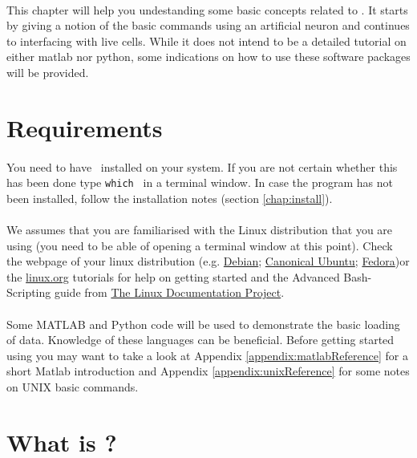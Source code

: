\paragraph{}
This chapter will help you undestanding some basic concepts related to \progname. It starts by giving a notion of the basic commands using an artificial neuron and continues to interfacing with live cells. While it does not intend to be a detailed tutorial on either matlab nor python, some indications on how to use these software packages will be provided.

\section{Requirements}
\paragraph{}
You need to have \progname\ installed on your system. If you are not certain whether this has been done type \texttt{which \progname} in a terminal window. In case the program has not been installed, follow the installation notes (section \ref{chap:install}).

\paragraph{}
We assumes that you are familiarised with the Linux distribution that you are using (you need to be able of opening a terminal window at this point). Check the webpage of your linux distribution (e.g. \href{http://www.debian.org}{Debian}; \href{http://www.ubuntu.com}{Canonical Ubuntu}; \href{http://www.fedoraproject.org}{Fedora})or the \href{http://www.linux.org/tutorial}{linux.org} tutorials for help on getting started and the Advanced Bash-Scripting guide from \href{http://www.tldp.org}{The Linux Documentation Project}.

\paragraph{}
Some MATLAB and Python code will be used to demonstrate the basic loading of data. Knowledge of these languages can be beneficial.
Before getting started using \texttt{\progname} you may want to take a look at Appendix \ref{appendix:matlabReference} for a short Matlab introduction and Appendix \ref{appendix:unixReference} for some notes on UNIX basic commands.

\section{What is \progname?}

